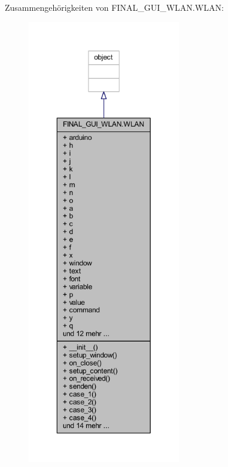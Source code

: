 Zusammengehörigkeiten von F\+I\+N\+A\+L\+\_\+\+G\+U\+I\+\_\+\+W\+L\+A\+N.\+W\+L\+AN\+:\nopagebreak
\begin{figure}[H]
\begin{center}
\leavevmode
\includegraphics[height=550pt]{class_f_i_n_a_l___g_u_i___w_l_a_n_1_1_w_l_a_n__coll__graph}
\end{center}
\end{figure}
